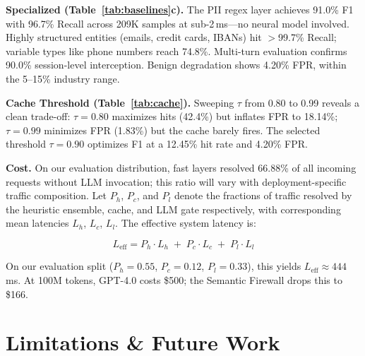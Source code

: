 \documentclass[conference]{IEEEtran}
\begin{document}
\textbf{Specialized (Table~\ref{tab:baselines}c).}
The PII regex layer achieves 91.0\% F1 with 96.7\% Recall across
209K samples at sub-2\,ms---no neural model involved. Highly
structured entities (emails, credit cards, IBANs) hit $>$99.7\%
Recall; variable types like phone numbers reach 74.8\%. Multi-turn
evaluation confirms 90.0\% session-level interception. Benign degradation shows 4.20\% FPR,
within the 5--15\% industry range.

\textbf{Cache Threshold (Table~\ref{tab:cache}).}
Sweeping $\tau$ from 0.80 to 0.99 reveals a clean trade-off:
$\tau{=}0.80$ maximizes hits (42.4\%) but inflates FPR to 18.14\%;
$\tau{=}0.99$ minimizes FPR (1.83\%) but the cache barely fires.
The selected threshold $\tau{=}0.90$ optimizes F1 at a 12.45\% hit
rate and 4.20\% FPR.

\textbf{Cost.}
On our evaluation distribution, fast layers resolved 66.88\% of all
incoming requests without LLM invocation; this ratio will vary with
deployment-specific traffic composition. Let $P_h$, $P_c$, and $P_l$ denote the fractions of traffic resolved by the heuristic
ensemble, cache, and LLM gate respectively, with corresponding
mean latencies $L_h$, $L_c$, $L_l$. The effective system latency is:

\begin{equation}
L_{\text{eff}} = P_h \cdot L_h \;+\; P_c \cdot L_c \;+\; P_l \cdot L_l
\label{eq:latency}
\end{equation}

\noindent On our evaluation split ($P_h{=}0.55$, $P_c{=}0.12$,
$P_l{=}0.33$), this yields $L_{\text{eff}} \approx 444$\,ms. At
100M tokens, GPT-4.0 costs \$500; the Semantic Firewall drops this
to \$166.



\section{Limitations \& Future Work}
\end{document}

